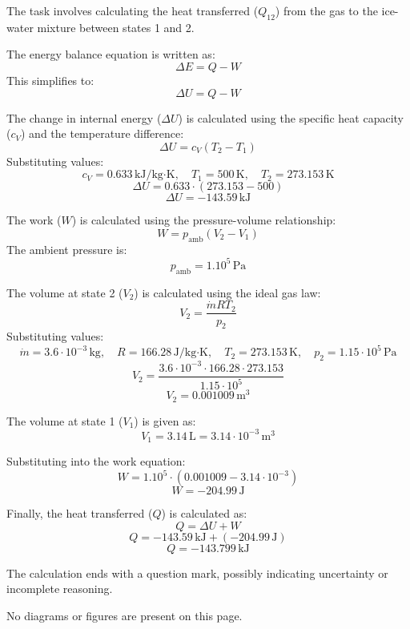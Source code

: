 The task involves calculating the heat transferred (\( Q_{12} \)) from the gas to the ice-water mixture between states 1 and 2.

The energy balance equation is written as:  
\[
\Delta E = Q - W
\]  
This simplifies to:  
\[
\Delta U = Q - W
\]  

The change in internal energy (\( \Delta U \)) is calculated using the specific heat capacity (\( c_V \)) and the temperature difference:  
\[
\Delta U = c_V (T_2 - T_1)
\]  
Substituting values:  
\[
c_V = 0.633 \, \text{kJ/kg·K}, \quad T_1 = 500 \, \text{K}, \quad T_2 = 273.153 \, \text{K}
\]  
\[
\Delta U = 0.633 \cdot (273.153 - 500)
\]  
\[
\Delta U = -143.59 \, \text{kJ}
\]  

The work (\( W \)) is calculated using the pressure-volume relationship:  
\[
W = p_{\text{amb}} (V_2 - V_1)
\]  
The ambient pressure is:  
\[
p_{\text{amb}} = 1.10^5 \, \text{Pa}
\]  

The volume at state 2 (\( V_2 \)) is calculated using the ideal gas law:  
\[
V_2 = \frac{\dot{m} R T_2}{p_2}
\]  
Substituting values:  
\[
\dot{m} = 3.6 \cdot 10^{-3} \, \text{kg}, \quad R = 166.28 \, \text{J/kg·K}, \quad T_2 = 273.153 \, \text{K}, \quad p_2 = 1.15 \cdot 10^5 \, \text{Pa}
\]  
\[
V_2 = \frac{3.6 \cdot 10^{-3} \cdot 166.28 \cdot 273.153}{1.15 \cdot 10^5}
\]  
\[
V_2 = 0.001009 \, \text{m}^3
\]  

The volume at state 1 (\( V_1 \)) is given as:  
\[
V_1 = 3.14 \, \text{L} = 3.14 \cdot 10^{-3} \, \text{m}^3
\]  

Substituting into the work equation:  
\[
W = 1.10^5 \cdot (0.001009 - 3.14 \cdot 10^{-3})
\]  
\[
W = -204.99 \, \text{J}
\]  

Finally, the heat transferred (\( Q \)) is calculated as:  
\[
Q = \Delta U + W
\]  
\[
Q = -143.59 \, \text{kJ} + (-204.99 \, \text{J})
\]  
\[
Q = -143.799 \, \text{kJ}
\]  

The calculation ends with a question mark, possibly indicating uncertainty or incomplete reasoning.  

No diagrams or figures are present on this page.